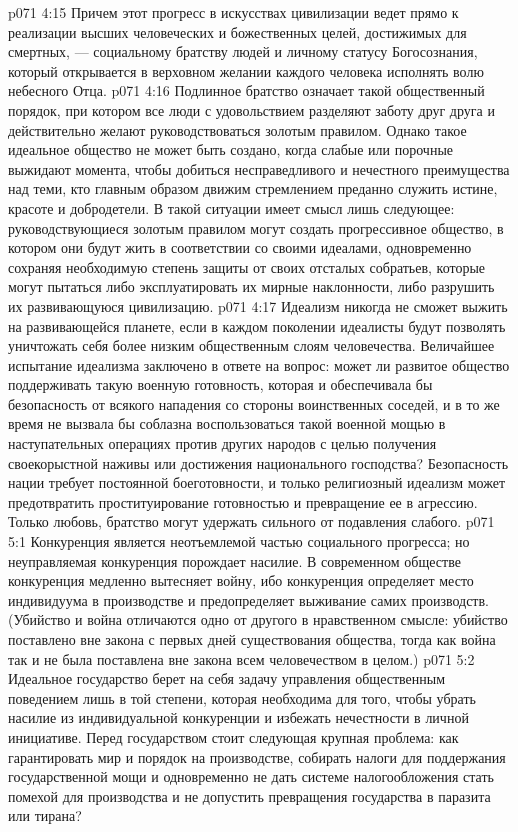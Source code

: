 \vs p071 4:15 \pc Причем этот прогресс в искусствах цивилизации ведет прямо к реализации высших человеческих и божественных целей, достижимых для смертных, --- социальному братству людей и личному статусу Богосознания, который открывается в верховном желании каждого человека исполнять волю небесного Отца.
\vs p071 4:16 Подлинное братство означает такой общественный порядок, при котором все люди с удовольствием разделяют заботу друг друга и действительно желают руководствоваться золотым правилом. Однако такое идеальное общество не может быть создано, когда слабые или порочные выжидают момента, чтобы добиться несправедливого и нечестного преимущества над теми, кто главным образом движим стремлением преданно служить истине, красоте и добродетели. В такой ситуации имеет смысл лишь следующее: руководствующиеся золотым правилом могут создать прогрессивное общество, в котором они будут жить в соответствии со своими идеалами, одновременно сохраняя необходимую степень защиты от своих отсталых собратьев, которые могут пытаться либо эксплуатировать их мирные наклонности, либо разрушить их развивающуюся цивилизацию.
\vs p071 4:17 Идеализм никогда не сможет выжить на развивающейся планете, если в каждом поколении идеалисты будут позволять уничтожать себя более низким общественным слоям человечества. Величайшее испытание идеализма заключено в ответе на вопрос: может ли развитое общество поддерживать такую военную готовность, которая и обеспечивала бы безопасность от всякого нападения со стороны воинственных соседей, и в то же время не вызвала бы соблазна воспользоваться такой военной мощью в наступательных операциях против других народов с целью получения своекорыстной наживы или достижения национального господства? Безопасность нации требует постоянной боеготовности, и только религиозный идеализм может предотвратить проституирование готовностью и превращение ее в агрессию. Только любовь, братство могут удержать сильного от подавления слабого.
\vs p071 5:1 Конкуренция является неотъемлемой частью социального прогресса; но неуправляемая конкуренция порождает насилие. В современном обществе конкуренция медленно вытесняет войну, ибо конкуренция определяет место индивидуума в производстве и предопределяет выживание самих производств. (Убийство и война отличаются одно от другого в нравственном смысле: убийство поставлено вне закона с первых дней существования общества, тогда как война так и не была поставлена вне закона всем человечеством в целом.)
\vs p071 5:2 Идеальное государство берет на себя задачу управления общественным поведением лишь в той степени, которая необходима для того, чтобы убрать насилие из индивидуальной конкуренции и избежать нечестности в личной инициативе. Перед государством стоит следующая крупная проблема: как гарантировать мир и порядок на производстве, собирать налоги для поддержания государственной мощи и одновременно не дать системе налогообложения стать помехой для производства и не допустить превращения государства в паразита или тирана?
